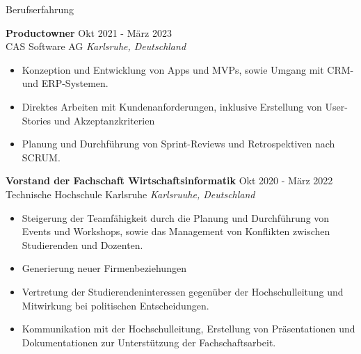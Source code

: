 \documentclass{resume} %
\begin{document}
\begin{rSection}{Berufserfahrung}

    \textbf{Productowner} \hfill Okt 2021 - März 2023\\
    CAS Software AG \hfill \textit{Karlsruhe, Deutschland}
    \begin{itemize}
        \itemsep -3pt {}
        \item \raggedright{Konzeption und Entwicklung von Apps und MVPs, sowie Umgang mit CRM- und ERP-Systemen.}
        \item \raggedright{Direktes Arbeiten mit Kundenanforderungen, inklusive Erstellung von User-Stories und Akzeptanzkriterien}
        \item \raggedright{Planung und Durchführung von Sprint-Reviews und Retrospektiven nach SCRUM.}
    \end{itemize}

    \textbf{Vorstand der Fachschaft Wirtschaftsinformatik} \hfill Okt 2020 - März 2022\\
    Technische Hochschule Karlsruhe \hfill \textit{Karlsruuhe, Deutschland}
    \begin{itemize}
        \itemsep -3pt {}
        \item \raggedright{Steigerung der Teamfähigkeit durch die Planung und Durchführung von Events und Workshops, sowie das Management von Konflikten zwischen Studierenden und Dozenten.} 
        \item \raggedright{Generierung neuer Firmenbeziehungen}
        \item \raggedright{Vertretung der Studierendeninteressen gegenüber der Hochschulleitung und Mitwirkung bei politischen Entscheidungen.}
        \item \raggedright{Kommunikation mit der Hochschulleitung, Erstellung von Präsentationen und Dokumentationen zur Unterstützung der Fachschaftsarbeit.}
    \end{itemize}
\end{rSection}


\end{document}
